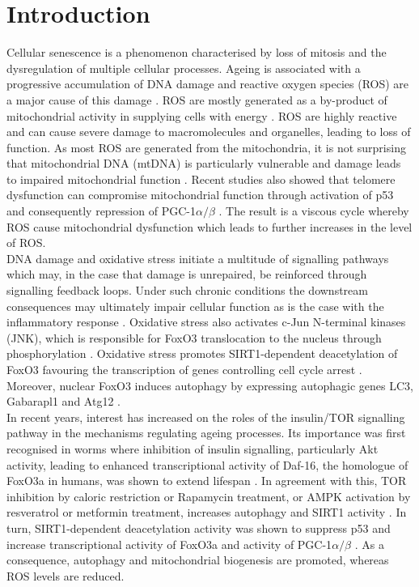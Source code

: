 \section{Introduction}
\label{project3-sec:Introduction}
Cellular senescence is a phenomenon characterised by loss of mitosis and the dysregulation of multiple cellular processes. Ageing is associated with a progressive accumulation of DNA damage and reactive oxygen species (ROS) are a major cause of this damage \citep{Finkel2000}. ROS are mostly generated as a by-product of mitochondrial activity in supplying cells with energy \citep{Turrens2003}. ROS are highly reactive and can cause severe damage to macromolecules and organelles, leading to loss of function. As most ROS are generated from the mitochondria, it is not surprising that mitochondrial DNA (mtDNA) is particularly vulnerable and damage leads to impaired mitochondrial function \citep{Passos2007, Shokolenko2009}. Recent studies also showed that telomere dysfunction can compromise mitochondrial function through activation of p53 and consequently repression of PGC-1$\alpha/\beta$ \citep{Sahin2011}. The result is a viscous cycle whereby ROS cause mitochondrial dysfunction which leads to further increases in 
the 
level of ROS. \\
DNA damage and oxidative stress initiate a multitude of signalling pathways which may, in the case that damage is unrepaired, be reinforced through signalling feedback loops. Under such chronic conditions the downstream consequences may ultimately impair cellular function as is the case with the inflammatory response \citep{Passos2010}. Oxidative stress also activates c-Jun N-terminal kinases (JNK), which is responsible for FoxO3 translocation to the nucleus through phosphorylation \citep{Greer2005, Greer2008}. Oxidative stress promotes SIRT1-dependent deacetylation of FoxO3 favouring the transcription of genes controlling cell cycle arrest \citep{Brunet2004, Greer2005}. Moreover, nuclear FoxO3 induces autophagy by expressing autophagic genes LC3, Gabarapl1 and Atg12 \citep{Sengupta2009,VanDerVos2012}. \\
In recent years, interest has increased on the roles of the insulin/TOR signalling pathway in the mechanisms regulating ageing processes. Its importance was first recognised in worms where inhibition of insulin signalling, particularly Akt activity, leading to enhanced transcriptional activity of Daf-16, the homologue of FoxO3a in humans, was shown to extend lifespan \citep{Lee2003, Murphy2003}. In agreement with this, TOR inhibition by caloric restriction or Rapamycin treatment, or AMPK activation by resveratrol or metformin treatment, increases autophagy \citep{Lee2010,Kim2011} and SIRT1 activity \citep{Rodgers2005, Lagouge2006, Canto2009}. In turn, SIRT1-dependent deacetylation activity was shown to suppress p53 \citep{Vaziri2001} and increase transcriptional activity of FoxO3a and activity of PGC-1$\alpha/\beta$ \citep{Rodgers2005, Lagouge2006, Canto2009}. As a consequence, autophagy and mitochondrial biogenesis are promoted, whereas ROS levels are reduced. \\
